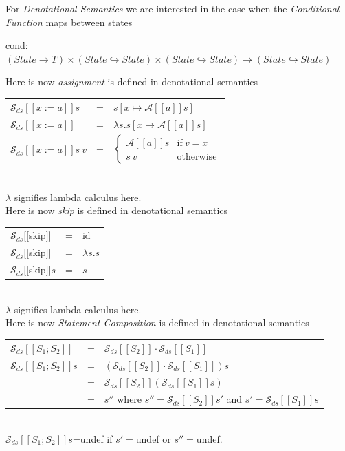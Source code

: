 \documentclass[11pt,a4paper]{article}
\begin{document}
For \textit{Denotational Semantics} we are interested in the case when the \textit{Conditional Function} maps between states
\begin{center}
cond:$(State\to T)\times(State\hookrightarrow State)\times(State\hookrightarrow State)\to(State\hookrightarrow State)$
\end{center}

Here is now \textit{assignment} is defined in denotational semantics\\
\begin{tabular}{lcl}
$\mathcal{S}_{ds}[[x:=a]]s$&=&$s[x\mapsto\mathcal{A}[[a]]s]$\\
$\mathcal{S}_{ds}[[x:=a]]$&=&$\lambda s.s[x\mapsto\mathcal{A}[[a]]s]$\\
$\mathcal{S}_{ds}[[x:=a]]s\ v$&=&$\begin{cases}\mathcal{A}[[a]]s&\mathrm{if\ }v=x\\s\ v&\mathrm{otherwise}\end{cases}$
\end{tabular}
\\
\nb $\lambda$ signifies lambda calculus here.\\

Here is now \textit{skip} is defined in denotational semantics\\
\begin{tabular}{lcl}
$\mathcal{S}_{ds}[[$skip$]]$&=&id\\
$\mathcal{S}_{ds}[[$skip$]]$&=&$\lambda s.s$\\
$\mathcal{S}_{ds}[[$skip$]]s$&=&$s$
\end{tabular}
\\
\nb $\lambda$ signifies lambda calculus here.\\

Here is now \textit{Statement Composition} is defined in denotational semantics\\
\begin{tabular}{lcl}
$\mathcal{S}_{ds}[[S_1;S_2]]$&=&$\mathcal{S}_{ds}[[S_2]]\cdot\mathcal{S}_{ds}[[S_1]]$\\
$\mathcal{S}_{ds}[[S_1;S_2]]s$&=&$(\mathcal{S}_{ds}[[S_2]]\cdot\mathcal{S}_{ds}[[S_1]])s$\\
&=&$\mathcal{S}_{ds}[[S_2]](\mathcal{S}_{ds}[[S_1]]s)$\\
&=&$s''$ where $s''=\mathcal{S}_{ds}[[S_2]]s'$ and $s'=\mathcal{S}_{ds}[[S_1]]s$
\end{tabular}\\
\nb $\mathcal{S}_{ds}[[S_1;S_2]]s$=undef if $s'=$undef or $s''=$undef.\\
\end{document}
